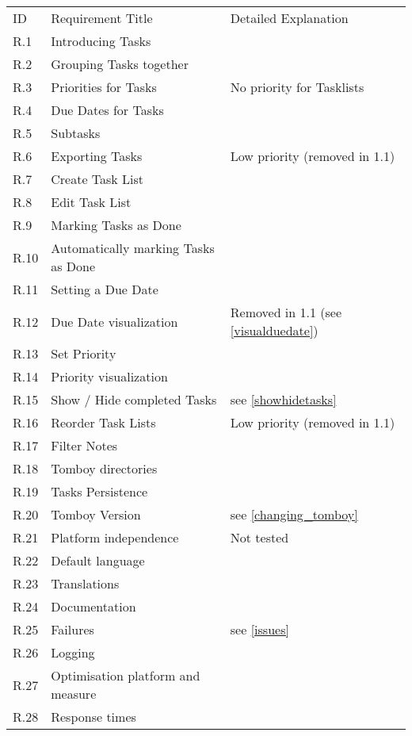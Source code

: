 \begin{tabular}{lll}
\rowcolor[gray]{0.9}
ID  & Requirement Title   & Detailed Explanation	\\
\completed	R.1		& Introducing Tasks   & 						\\
\completed	R.2		& Grouping Tasks together & \\
\parts		R.3		& Priorities for Tasks & No priority for Tasklists\\
\completed	R.4		& Due Dates for Tasks & \\
\completed	R.5		& Subtasks & \\
\notdone	R.6		& Exporting Tasks & Low priority (removed in 1.1)\\
\completed	R.7		& Create Task List & \\
\completed	R.8		& Edit Task List & \\
\completed	R.9		& Marking Tasks as Done & \\
\completed	R.10	& Automatically marking Tasks as Done & \\
\completed	R.11	& Setting a Due Date & \\
\notdone	R.12	& Due Date visualization & Removed in 1.1 (see \ref{visualduedate})\\
\completed	R.13	& Set Priority & \\
\completed	R.14	& Priority visualization & \\
\parts		R.15	& Show / Hide completed Tasks & see \ref{showhidetasks}\\
\notdone	R.16	& Reorder Task Lists & Low priority (removed in 1.1)\\
\completed	R.17	& Filter Notes & \\
\completed	R.18	& Tomboy directories & \\
\completed	R.19	& Tasks Persistence & \\
\notdone	R.20	& Tomboy Version & see \ref{changing_tomboy}\\
\parts		R.21	& Platform independence & Not tested\\
\completed	R.22	& Default language & \\
\completed	R.23	& Translations & \\
\completed	R.24	& Documentation & \\
\parts		R.25	& Failures & see \ref{issues} \\
\completed	R.26	& Logging & \\
\completed	R.27	& Optimisation platform and measure & \\
\completed	R.28	& Response times & \\

\end{tabular}

